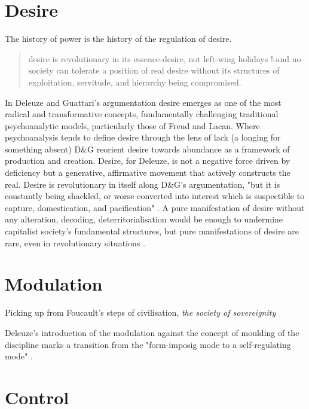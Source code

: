 \section{Desire}\label{sec:Desire} %
The history of power is the history of the regulation of desire.
%
\begin{quote}
	desire is revolutionary in its essence-desire, not left-wing holidays !-and
	no society can tolerate a position of real desire without its structures of
	exploitation, servitude, and hierarchy being compromised.
	\cite[116]{deleuze1983}
\end{quote}

In Deleuze and Guattari's argumentation desire emerges as one of the most radical and transformative concepts, fundamentally challenging traditional psychoanalytic models, particularly those of Freud and Lacan. Where psychoanalysis tends to define desire through the lens of lack (a longing for something absent) D\&G reorient desire towards abundance as a framework of production and creation. Desire, for Deleuze, is not a negative force driven by deficiency but a generative, affirmative movement that actively constructs the real.
Desire is revolutionary in itself along D\&G's argumentation, "but it is
constantly being shackled, or worse converted into interest which is
suspectible to capture, domestication, and pacification"
\parencite[11]{buchanan2008}. A pure manifestation of desire without any
alteration, decoding, deterritorialisation would be enough to undermine
capitalist society's fundamental structures, but pure manifestations of desire
are rare, even in revolutionary situations \parencite[11]{buchanan2008}.



\section{Modulation}\label{sec:Modulation} %

Picking up from Foucault's steps of civilisation, \emph{the society of sovereignity}

Deleuze's introduction of the modulation against the concept of moulding of the
discipline marks a transition from the "form-imposig mode to a self-regulating
mode" \parencite[74]{hui2015}.

\section{Control}\label{sec:Control} %

